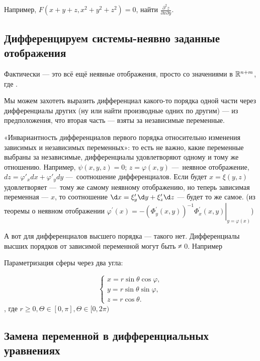 \documentclass[12pt, a4paper]{article}
\begin{document}
Например, $F(x + y + z, x^2 + y^2 + z^2) = 0$, найти $\frac{\partial^2 z}{\partial x \partial y}$.

\subsection{Дифференцируем системы-неявно заданные отображения}

Фактически — это всё ещё неявные отображения, просто со значениями в ${\mathbb{R}}^{n + m}$, где .

Мы можем захотеть выразить дифференциал какого-то порядка одной части через дифференциалы других 
(ну или найти производные одних по другим) — из предположения, что вторая часть — взяты за независимые переменные.

«Инвариантность дифференциалов первого порядка относительно изменения зависимых и независимых переменных»:
то есть не важно, какие переменные выбраны за независимые, дифференциалы удовлетворяют одному и тому же отношению.
Например, $\psi(x, y, z) = 0$; $z = \varphi(x, y)$ — неявное отображение, $dz = \varphi'_x dx + \varphi'_y dy$ — соотношение дифференциалов. 
Если будет $x = \xi(y, z)$ удовлетворяет — тому же самому неявному отображению, 
но теперь зависимая переменная — $x$, то соотношение $\d x = \xi'_y \d y + \xi'_z \d z$ — будет то же самое.
(из теоремы о неявном отображении $\varphi^{\prime}(x)=-\left.\left(\Phi_y^{\prime}(x, y)\right)^{-1} \Phi_x^{\prime}(x, y)\right|_{y=\varphi(x)}$)


А вот для дифференциалов высшего порядка — такого нет. Дифференциалы высших порядков от зависимой переменной могут быть ≠ 0.
Например


Параметризация сферы через два угла:

\begin{equation}
  {\displaystyle {\begin{cases}x=r\sin \theta \cos \varphi ,\\y=r\sin \theta \sin \varphi ,\\z=r\cos \theta .\end{cases}}}
\end{equation}
, где $r \geq 0, \Theta \in [0, \pi], \Theta \in [0, 2\pi)$

\subsection{Замена переменной в дифференциальных уравнениях}
\end{document}
